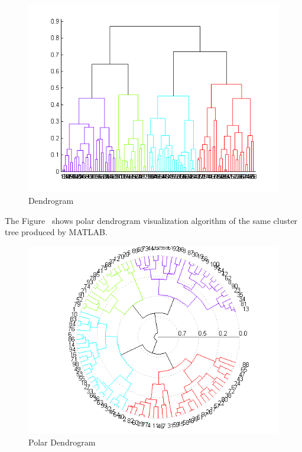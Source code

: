 \documentclass[a4paper,oneside]{article}
\begin{document}
\begin{figure}
\begin{center}
	\includegraphics[scale=1.0]{pictures/dendrogram.png}
	\caption{Dendrogram}
	\label{dendrogram_1}
\end{center}
\end{figure}


The Figure~\cite{polardendrogram} shows polar dendrogram visualization algorithm of the same cluster tree produced by MATLAB.

\begin{figure}
\begin{center}
	\includegraphics[scale=1.0]{pictures/polardendrogram.png}
	\caption{Polar Dendrogram}
	\label{polardendrogram}
\end{center}
\end{figure}
\end{document}
